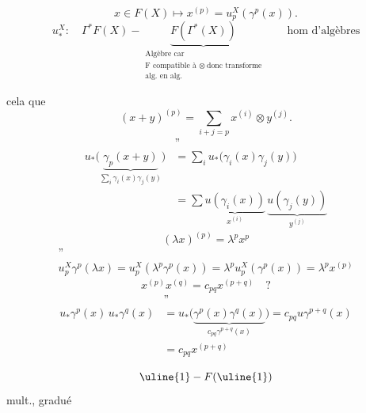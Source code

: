 
\[
x\in F(X)\longmapsto x^{(p)}=u_p^X(\gamma^p(x)).
\]
\[
u_*^X:\quad \Gamma^*F(X)-
\underbrace{F(\Gamma^*(X))}_{\substack{\text{Algèbre car}\\
\text{F compatible à }\otimes\ \text{donc transforme}\\
\text{alg. en alg.}}}
\qquad \text{hom d'algèbres}
\]

cela   que
\[
(x+y)^{(p)}=\sum_{i+j=p}x^{(i)}\otimes y^{(j)}.
\]
\[
\begin{aligned}
&\text{''}\\
u_*\bigl(\underbrace{\gamma_p(x+y)}_{\sum_i\gamma_i(x)\gamma_j(y)}\bigr)
&=\sum_i u_*\bigl(\gamma_i(x)\gamma_j(y)\bigr)\\
&=\sum\underbrace{u(\gamma_i(x))}_{x^{(i)}}\,
\underbrace{u(\gamma_j(y))}_{y^{(j)}}
\end{aligned}
\]
\[
(\lambda x)^{(p)}=\lambda^p x^p
\]
\[
\begin{gathered}
\text{''}\\
u_p^X\gamma^p(\lambda x)=u_p^X(\lambda^p\gamma^p(x))
=\lambda^p u_p^X(\gamma^p(x))=\lambda^p x^{(p)}
\end{gathered}
\]
\[
x^{(p)}x^{(q)}=c_{pq}x^{(p+q)}\quad ?
\]
\[
\begin{aligned}
&\text{''}\\
u_*\gamma^p(x)\,u_*\gamma^q(x)
&=u_*\bigl(\underbrace{\gamma^p(x)\gamma^q(x)}_{c_{pq}\gamma^{p+q}(x)}\bigr)
=c_{pq}u\gamma^{p+q}(x)\\
&=c_{pq}x^{(p+q)}
\end{aligned}
\]

\[
\uline{1}-F(\uline{1})
\]
mult.,  gradué

